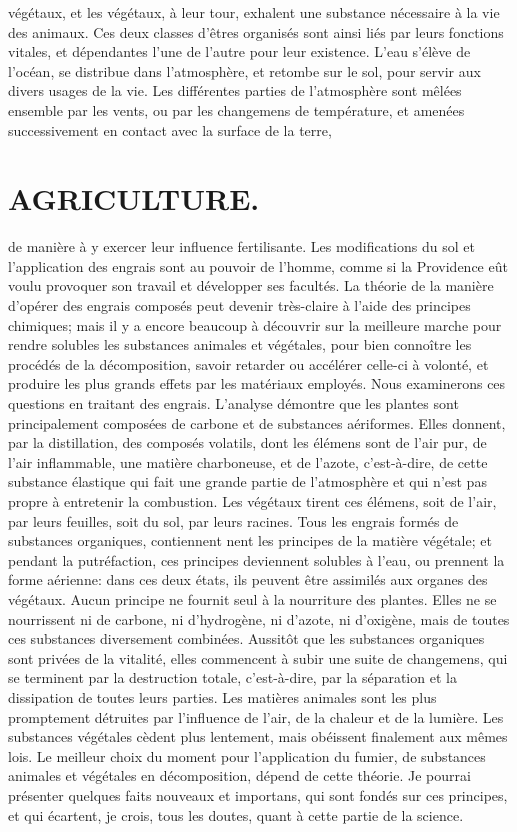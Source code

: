 végétaux, et les végétaux, à leur tour, exhalent une substance nécessaire à la vie des animaux. Ces deux classes d'êtres organisés sont ainsi liés par leurs fonctions vitales, et dépendantes l'une de l'autre pour leur existence. L'eau s'élève de l'océan, se distribue dans l'atmosphère, et retombe sur le sol, pour servir aux divers usages de la vie. Les différentes parties de l'atmosphère sont mêlées ensemble par les vents, ou par les changemens de température, et amenées successivement en contact avec la surface de la terre,\setcounter{page}{344} \section{AGRICULTURE.}
de manière à y exercer leur influence fertilisante. Les modifications du sol et l'application des engrais sont au pouvoir de l'homme, comme si la Providence eût voulu provoquer son travail et développer ses facultés.
La théorie de la manière d'opérer des engrais composés peut devenir très-claire à l'aide des principes chimiques; mais il y a encore beaucoup à découvrir sur la meilleure marche pour rendre solubles les substances animales et végétales, pour bien connoître les procédés de la décomposition, savoir retarder ou accélérer celle-ci à volonté, et produire les plus grands effets par les matériaux employés. Nous examinerons ces questions en traitant des engrais.
L'analyse démontre que les plantes sont principalement composées de carbone et de substances aériformes. Elles donnent, par la distillation, des composés volatils, dont les élémens sont de l'air pur, de l'air inflammable, une matière charboneuse, et de l'azote, c'est-à-dire, de cette substance élastique qui fait une grande partie de l'atmosphère et qui n'est pas propre à entretenir la combustion. Les végétaux tirent ces élémens, soit de l'air, par leurs feuilles, soit du sol, par leurs racines. Tous les engrais formés de substances organiques, contiennent\setcounter{page}{345} nent les principes de la matière végétale; et pendant la putréfaction, ces principes deviennent solubles à l'eau, ou prennent la forme aérienne: dans ces deux états, ils peuvent être assimilés aux organes des végétaux. Aucun principe ne fournit seul à la nourriture des plantes. Elles ne se nourrissent ni de carbone, ni d'hydrogène, ni d'azote, ni d'oxigène, mais de toutes ces substances diversement combinées.
Aussitôt que les substances organiques sont privées de la vitalité, elles commencent à subir une suite de changemens, qui se terminent par la destruction totale, c'est-à-dire, par la séparation et la dissipation de toutes leurs parties. Les matières animales sont les plus promptement détruites par l'influence de l'air, de la chaleur et de la lumière. Les substances végétales cèdent plus lentement, mais obéissent finalement aux mêmes lois. Le meilleur choix du moment pour l'application du fumier, de substances animales et végétales en décomposition, dépend de cette théorie. Je pourrai présenter quelques faits nouveaux et importans, qui sont fondés sur ces principes, et qui écartent, je crois, tous les doutes, quant à cette partie de la science.
